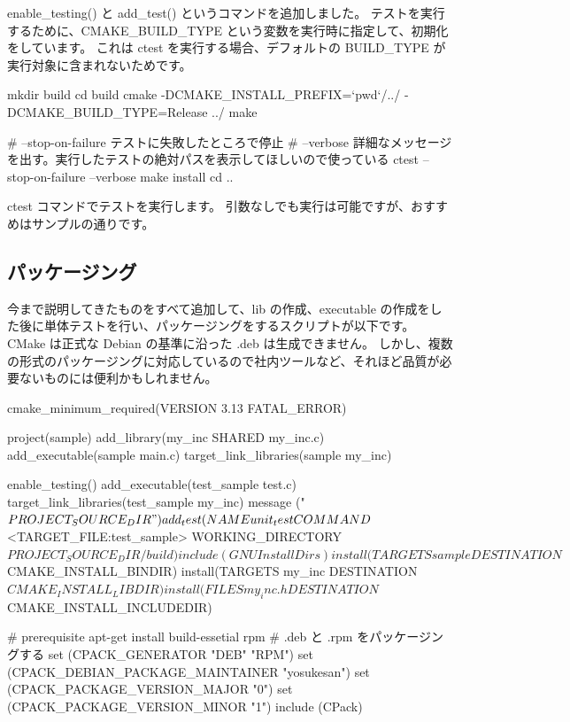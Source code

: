 \documentclass[mingoth,a4paper]{jsarticle}
\begin{document}
enable\_testing() と add\_test() というコマンドを追加しました。
テストを実行するために、CMAKE\_BUILD\_TYPE という変数を実行時に指定して、初期化をしています。
これは ctest を実行する場合、デフォルトの BUILD\_TYPE が実行対象に含まれないためです。 

\begin{commandline}
mkdir build
cd build
cmake -DCMAKE_INSTALL_PREFIX=`pwd`/../  -DCMAKE_BUILD_TYPE=Release ../
make

# --stop-on-failure テストに失敗したところで停止
# --verbose 詳細なメッセージを出す。実行したテストの絶対パスを表示してほしいので使っている
ctest --stop-on-failure --verbose
make install
cd ..
\end{commandline}

ctest コマンドでテストを実行します。 
引数なしでも実行は可能ですが、おすすめはサンプルの通りです。

\subsection{パッケージング}

今まで説明してきたものをすべて追加して、lib の作成、executable の作成をした後に単体テストを行い、パッケージングをするスクリプトが以下です。
CMake は正式な Debian の基準に沿った .deb は生成できません。
しかし、複数の形式のパッケージングに対応しているので社内ツールなど、それほど品質が必要ないものには便利かもしれません。

\begin{commandline}
cmake_minimum_required(VERSION 3.13 FATAL_ERROR)

project(sample)
add_library(my_inc SHARED my_inc.c)
add_executable(sample main.c)
target_link_libraries(sample my_inc)

enable_testing()
add_executable(test_sample test.c)
target_link_libraries(test_sample my_inc)
message ("${PROJECT_SOURCE_DIR}")
add_test(NAME unit_test COMMAND $<TARGET_FILE:test_sample> WORKING_DIRECTORY ${PROJECT_SOURCE_DIR}/build)

include(GNUInstallDirs)
install(TARGETS sample DESTINATION ${CMAKE_INSTALL_BINDIR})
install(TARGETS my_inc DESTINATION ${CMAKE_INSTALL_LIBDIR})
install(FILES my_inc.h DESTINATION ${CMAKE_INSTALL_INCLUDEDIR})

# prerequisite apt-get install build-essetial rpm
# .deb と .rpm をパッケージングする
set (CPACK_GENERATOR "DEB" "RPM")
set (CPACK_DEBIAN_PACKAGE_MAINTAINER "yosukesan")
set (CPACK_PACKAGE_VERSION_MAJOR "0")
set (CPACK_PACKAGE_VERSION_MINOR "1")
include (CPack)
\end{commandline}
\end{document}
